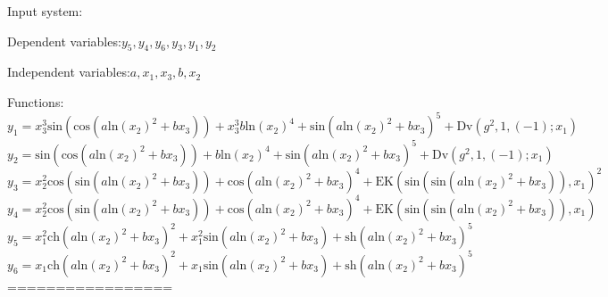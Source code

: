 \documentclass[10pt,a4paper]{article}
\begin{document}
Input system:

Dependent variables:$y_{5}, y_{4}, y_{6}, y_{3}, y_{1}, y_{2}$

Independent variables:$a, x_{1}, x_{3}, b, x_{2}$

Functions:
\begin{dmath*}y_{1} = x_{3} ^ {3}  \text{sin}\left(\text{cos}\left(a  \text{ln}\left(x_{2}\right) ^ {2} + b  x_{3}\right)\right) + x_{3} ^ {3}  b  \text{ln}\left(x_{2}\right) ^ {4} + \text{sin}\left(a  \text{ln}\left(x_{2}\right) ^ {2} + b  x_{3}\right) ^ {5} + \text{Dv}\left(g ^ {2}, 1, \left(-1\right); x_{1}\right)\end{dmath*}
\begin{dmath*}y_{2} = \text{sin}\left(\text{cos}\left(a  \text{ln}\left(x_{2}\right) ^ {2} + b  x_{3}\right)\right) + b  \text{ln}\left(x_{2}\right) ^ {4} + \text{sin}\left(a  \text{ln}\left(x_{2}\right) ^ {2} + b  x_{3}\right) ^ {5} + \text{Dv}\left(g ^ {2}, 1, \left(-1\right); x_{1}\right)\end{dmath*}
\begin{dmath*}y_{3} = x_{2} ^ {2}  \text{cos}\left(\text{sin}\left(a  \text{ln}\left(x_{2}\right) ^ {2} + b  x_{3}\right)\right) + \text{cos}\left(a  \text{ln}\left(x_{2}\right) ^ {2} + b  x_{3}\right) ^ {4} + \text{EK}\left(\text{sin}\left(\text{sin}\left(a  \text{ln}\left(x_{2}\right) ^ {2} + b  x_{3}\right)\right), x_{1}\right) ^ {2}\end{dmath*}
\begin{dmath*}y_{4} = x_{2} ^ {2}  \text{cos}\left(\text{sin}\left(a  \text{ln}\left(x_{2}\right) ^ {2} + b  x_{3}\right)\right) + \text{cos}\left(a  \text{ln}\left(x_{2}\right) ^ {2} + b  x_{3}\right) ^ {4} + \text{EK}\left(\text{sin}\left(\text{sin}\left(a  \text{ln}\left(x_{2}\right) ^ {2} + b  x_{3}\right)\right), x_{1}\right)\end{dmath*}
\begin{dmath*}y_{5} = x_{1} ^ {2}  \text{ch}\left(a  \text{ln}\left(x_{2}\right) ^ {2} + b  x_{3}\right) ^ {2} + x_{1} ^ {2}  \text{sin}\left(a  \text{ln}\left(x_{2}\right) ^ {2} + b  x_{3}\right) + \text{sh}\left(a  \text{ln}\left(x_{2}\right) ^ {2} + b  x_{3}\right) ^ {5}\end{dmath*}
\begin{dmath*}y_{6} = x_{1}  \text{ch}\left(a  \text{ln}\left(x_{2}\right) ^ {2} + b  x_{3}\right) ^ {2} + x_{1}  \text{sin}\left(a  \text{ln}\left(x_{2}\right) ^ {2} + b  x_{3}\right) + \text{sh}\left(a  \text{ln}\left(x_{2}\right) ^ {2} + b  x_{3}\right) ^ {5}\end{dmath*}
=================
\end{document}
